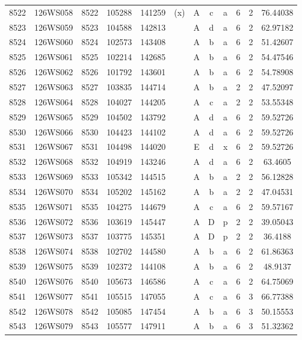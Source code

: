 \begin{tabular}{|*{12}{c|}}
8522 & 126WS058 & 8522 & 105288 & 141259 & (x) & A & c & a & 6 & 2 & 76.44038 \\ 
8523 & 126WS059 & 8523 & 104588 & 142813 &  & A & d & a & 6 & 2 & 62.97182 \\ 
8524 & 126WS060 & 8524 & 102573 & 143408 &  & A & b & a & 6 & 2 & 51.42607 \\ 
8525 & 126WS061 & 8525 & 102214 & 142685 &  & A & b & a & 6 & 2 & 54.47546 \\ 
8526 & 126WS062 & 8526 & 101792 & 143601 &  & A & b & a & 6 & 2 & 54.78908 \\ 
8527 & 126WS063 & 8527 & 103835 & 144714 &  & A & b & a & 2 & 2 & 47.52097 \\ 
8528 & 126WS064 & 8528 & 104027 & 144205 &  & A & c & a & 2 & 2 & 53.55348 \\ 
8529 & 126WS065 & 8529 & 104502 & 143792 &  & A & d & a & 6 & 2 & 59.52726 \\ 
8530 & 126WS066 & 8530 & 104423 & 144102 &  & A & d & a & 6 & 2 & 59.52726 \\ 
8531 & 126WS067 & 8531 & 104498 & 144020 &  & E & d & x & 6 & 2 & 59.52726 \\ 
8532 & 126WS068 & 8532 & 104919 & 143246 &  & A & d & a & 6 & 2 & 63.4605 \\ 
8533 & 126WS069 & 8533 & 105342 & 144515 &  & A & b & a & 2 & 2 & 56.12828 \\ 
8534 & 126WS070 & 8534 & 105202 & 145162 &  & A & b & a & 2 & 2 & 47.04531 \\ 
8535 & 126WS071 & 8535 & 104275 & 144679 &  & A & c & a & 6 & 2 & 59.57167 \\ 
8536 & 126WS072 & 8536 & 103619 & 145447 &  & A & D & p & 2 & 2 & 39.05043 \\ 
8537 & 126WS073 & 8537 & 103775 & 145351 &  & A & D & p & 2 & 2 & 36.4188 \\ 
8538 & 126WS074 & 8538 & 102702 & 144580 &  & A & b & a & 6 & 2 & 61.86363 \\ 
8539 & 126WS075 & 8539 & 102372 & 144108 &  & A & b & a & 6 & 2 & 48.9137 \\ 
8540 & 126WS076 & 8540 & 105673 & 146586 &  & A & c & a & 6 & 2 & 64.75069 \\ 
8541 & 126WS077 & 8541 & 105515 & 147055 &  & A & c & a & 6 & 3 & 66.77388 \\ 
8542 & 126WS078 & 8542 & 105085 & 147454 &  & A & b & a & 6 & 3 & 50.15553 \\ 
8543 & 126WS079 & 8543 & 105577 & 147911 &  & A & b & a & 6 & 3 & 51.32362 \\ 

\end{tabular}
